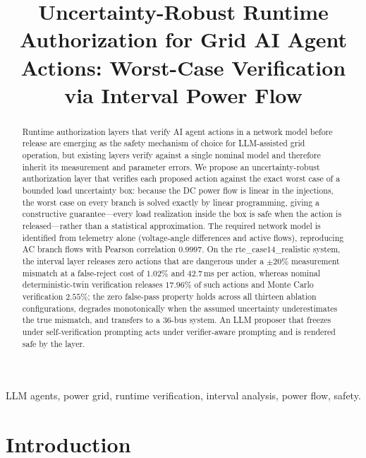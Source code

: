 \documentclass[journal]{IEEEtran}
\begin{document}
\title{Uncertainty-Robust Runtime Authorization for Grid AI Agent Actions: Worst-Case Verification via Interval Power Flow}


\maketitle

\begin{abstract}
Runtime authorization layers that verify AI agent actions in a network model
before release are emerging as the safety mechanism of choice for LLM-assisted
grid operation, but existing layers verify against a single nominal model and
therefore inherit its measurement and parameter errors. We propose an
uncertainty-robust authorization layer that verifies each proposed action
against the exact worst case of a bounded load uncertainty box: because the DC
power flow is linear in the injections, the worst case on every branch is
solved exactly by linear programming, giving a constructive guarantee---every
load realization inside the box is safe when the action is released---rather
than a statistical approximation. The required network model is identified
from telemetry alone (voltage-angle differences and active flows), reproducing
AC branch flows with Pearson correlation $0.9997$. On the
rte\_case14\_realistic system, the interval layer releases zero actions that
are dangerous under a $\pm 20\%$ measurement mismatch at a false-reject cost
of $1.02\%$ and $42.7$\,ms per action, whereas nominal deterministic-twin
verification releases $17.96\%$ of such actions and Monte Carlo verification
$2.55\%$; the zero false-pass property holds across all thirteen ablation
configurations, degrades monotonically when the assumed uncertainty
underestimates the true mismatch, and transfers to a 36-bus system. An LLM
proposer that freezes under self-verification prompting acts under
verifier-aware prompting and is rendered safe by the layer.
\end{abstract}

\begin{IEEEkeywords}
LLM agents, power grid, runtime verification, interval analysis, power flow,
safety.
\end{IEEEkeywords}

\section{Introduction}
\label{sec:intro}
\end{document}
